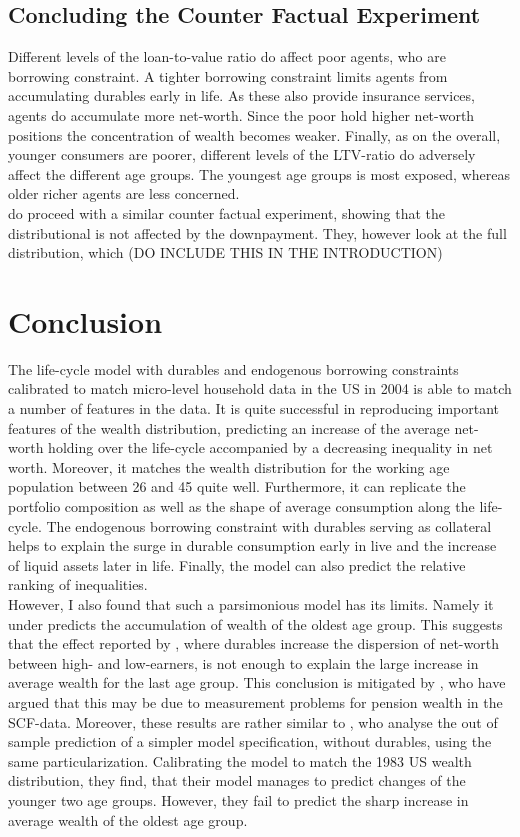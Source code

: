 \documentclass[12pt,a4paper,leqno]{article}
\theoremstyle{definition}
\begin{document}
\subsection{Concluding the Counter Factual Experiment}
Different levels of the loan-to-value ratio do affect poor agents, who are borrowing constraint. A tighter borrowing constraint limits agents from accumulating durables early in life. As these also provide insurance services, agents do accumulate more net-worth. Since the poor hold higher net-worth positions the concentration of wealth becomes weaker. Finally, as on the overall, younger consumers are poorer, different levels of the LTV-ratio do adversely affect the different age groups. The youngest age groups is most exposed, whereas older richer agents are less concerned. \\
\cite{diaz2010} do proceed with a similar counter factual experiment, showing that the distributional is not affected by the downpayment. They, however look at the full distribution, which (DO INCLUDE THIS IN THE INTRODUCTION) 

\section{Conclusion}
The life-cycle model with durables and endogenous borrowing constraints calibrated to match micro-level household data in the US in 2004 is able to match a number of features in the data. It is quite successful in reproducing important features of the wealth distribution, predicting an increase of the average net-worth holding over the life-cycle accompanied by a decreasing inequality in net worth. Moreover, it matches the wealth distribution for the working age population between 26 and 45 quite well. Furthermore, it can replicate the portfolio composition as well as the shape of average consumption along the life-cycle. The endogenous borrowing constraint with durables serving as collateral helps to explain the surge in durable consumption early in live and the increase of liquid assets later in life. Finally, the model can also predict the relative ranking of inequalities. \\
However, I also found that such a parsimonious model has its limits. Namely it under predicts the accumulation of wealth of the oldest age group. This suggests that the effect reported by \citep{FV&K2011}, where durables increase the dispersion of net-worth between high- and low-earners, is not enough to explain the large increase in average wealth for the last age group. This conclusion is mitigated by \cite{hintermaier2011}, who have argued that this may be due to measurement problems for pension wealth in the SCF-data. Moreover, these results are rather similar to \cite{hintermaier2011}, who analyse the out of sample prediction of a simpler model specification, without durables, using the same particularization. Calibrating the model to match the 1983 US wealth distribution, they find, that their model manages to predict changes of the younger two age groups. However, they fail to predict the sharp increase in average wealth of the oldest age group. 
\end{document}
